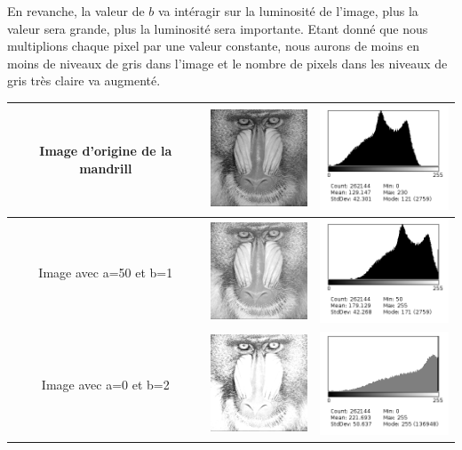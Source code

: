 \documentclass[a4paper,11pt]{article}
\begin{document}
  En revanche, la valeur de $b$ va intéragir sur la luminosité de l'image, plus la valeur sera grande,
  plus la luminosité sera importante.
  Etant donné que nous multiplions chaque pixel par une valeur constante, nous aurons de moins en moins
  de niveaux de gris dans l'image et le nombre de pixels dans les niveaux de gris très claire
  va augmenté.\\
  
  \begin{tabular}{|c|c|c|}
      \hline
      Image d'origine de la mandrill & \includegraphics[width=3cm]{mandrill.png} & \includegraphics[width=4cm]{../histo/image/hist_mandrill.png}\\
      \hline
      Image avec a=50 et b=1 & \includegraphics[width=3cm]{../res/mandrillQ2_50x1.png} & \includegraphics[width=4cm]{../histo/resultat/hist_mandrillQ2_50x1.png}\\
      \hline
      Image avec a=0 et b=2 & \includegraphics[width=3cm]{../res/mandrillQ2_0x2.png} & \includegraphics[width=4cm]{../histo/resultat/hist_mandrillQ2_0x2.png}\\
      \hline
  \end{tabular}
  
\end{document}
